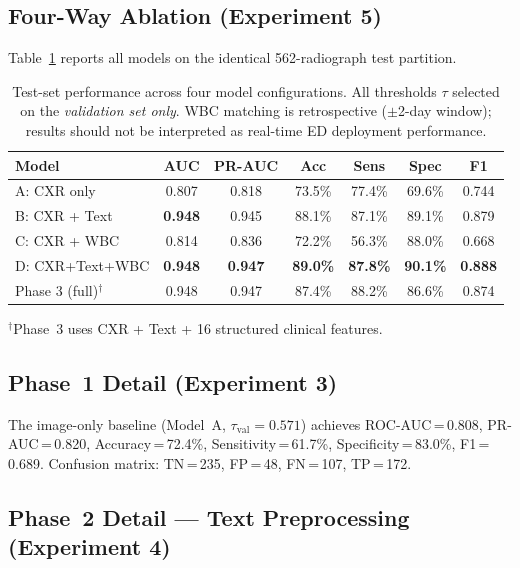 \documentclass{article}
\begin{document}
\subsection{Four-Way Ablation (Experiment 5)}

Table~\ref{tab:results} reports all models on the identical
562-radiograph test partition.

\begin{table}[h]
\centering
\caption{Test-set performance across four model configurations.
All thresholds $\tau$ selected on the \emph{validation set only}.
WBC matching is retrospective ($\pm$2-day window); results should
not be interpreted as real-time ED deployment performance.}
\label{tab:results}
\small
\setlength{\tabcolsep}{4pt}
\begin{tabular}{lcccccc}
\toprule
\textbf{Model} & \textbf{AUC} & \textbf{PR-AUC} & \textbf{Acc} & \textbf{Sens} & \textbf{Spec} & \textbf{F1} \\
\midrule
A: CXR only       & 0.807 & 0.818 & 73.5\% & 77.4\% & 69.6\% & 0.744 \\
B: CXR + Text     & \textbf{0.948} & 0.945 & 88.1\% & 87.1\% & 89.1\% & 0.879 \\
C: CXR + WBC      & 0.814 & 0.836 & 72.2\% & 56.3\% & 88.0\% & 0.668 \\
D: CXR+Text+WBC   & \textbf{0.948} & \textbf{0.947} & \textbf{89.0\%} & \textbf{87.8\%} & \textbf{90.1\%} & \textbf{0.888} \\
\midrule
Phase 3 (full)$^\dagger$ & 0.948 & 0.947 & 87.4\% & 88.2\% & 86.6\% & 0.874 \\
\bottomrule
\end{tabular}
{\small $^\dagger$Phase~3 uses CXR + Text + 16 structured clinical features.}
\end{table}

\subsection{Phase~1 Detail (Experiment 3)}

The image-only baseline (Model~A, $\tau_{\mathrm{val}}=0.571$) achieves
ROC-AUC\,=\,0.808, PR-AUC\,=\,0.820, Accuracy\,=\,72.4\%,
Sensitivity\,=\,61.7\%, Specificity\,=\,83.0\%, F1\,=\,0.689.
Confusion matrix: TN\,=\,235, FP\,=\,48, FN\,=\,107, TP\,=\,172.

\subsection{Phase~2 Detail — Text Preprocessing (Experiment 4)}
\end{document}
